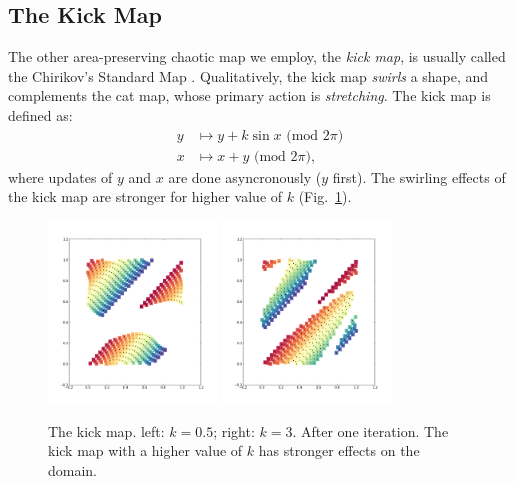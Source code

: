 \documentclass[12pt]{reedmcm}
\begin{document}
\subsection{The Kick Map}
The other area-preserving chaotic map we employ, the \textit{kick map}, is usually called the Chirikov's Standard Map \citep{ott}.
Qualitatively, the kick map \textit{swirls} a shape, and complements the cat map, whose primary action is \textit{stretching}.
The kick map is defined as:
\begin{align*}
  y &\mapsto y + k \sin x \mbox{ (mod $2\pi$)} \\
  x &\mapsto x + y \mbox{ (mod $2\pi$)},
\end{align*}
where updates of $y$ and $x$ are done asyncronously ($y$ first).
The swirling effects of the kick map are stronger for higher value of $k$ (Fig.~\ref{fig:kickmap_demo1}).
%
\begin{figure}[h!]
  \centering
  \includegraphics[width=0.4\textwidth]{kickmap_05}
  \hspace{2cm}
  \includegraphics[width=0.4\textwidth]{kickmap_3}
  \caption{The kick map. left: $k=0.5$; right: $k = 3$. After one iteration. 
    The kick map with a higher value of $k$ has stronger effects on the domain.
  }
  \label{fig:kickmap_demo1}
\end{figure}
%
\end{document}
